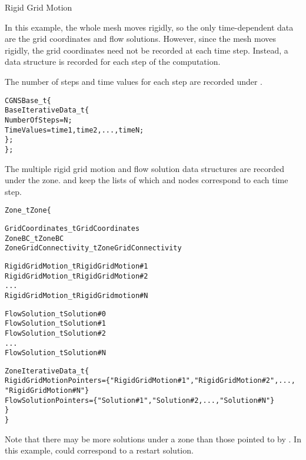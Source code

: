 \enlargethispage{\baselineskip}
\begin{example}{Rigid Grid Motion}
\label{ex:rigidmotion}

In this example, the whole mesh moves rigidly, so the only
time-dependent data are the grid coordinates and flow solutions.
However, since the mesh moves rigidly, the grid coordinates need not be
recorded at each time step.
Instead, a  data structure is recorded for
each step of the computation.

The number of steps and time values for each step are recorded under
.

\begin{alltt}
  CGNSBase\_t \{
    BaseIterativeData\_t \{
      NumberOfSteps = N ;
      TimeValues = time1, time2, ..., timeN ;
    \} ;
  \} ;
\end{alltt}

The multiple rigid grid motion and flow solution data structures are
recorded under the zone.
 and  keep the
lists of which  and  nodes
correspond to each time step.

\begin{alltt}
  Zone\_t Zone \{

    GridCoordinates\_t GridCoordinates
    ZoneBC\_t ZoneBC
    ZoneGridConnectivity\_t ZoneGridConnectivity

    RigidGridMotion\_t RigidGridMotion\#1
    RigidGridMotion\_t RigidGridMotion\#2
    ...
    RigidGridMotion\_t RigidGridmotion\#N

    FlowSolution\_t Solution\#0
    FlowSolution\_t Solution\#1
    FlowSolution\_t Solution\#2
    ...
    FlowSolution\_t Solution\#N

    ZoneIterativeData\_t \{
      RigidGridMotionPointers = \{"RigidGridMotion\#1", "RigidGridMotion\#2", ...,
         "RigidGridMotion\#N"\}
      FlowSolutionPointers = \{"Solution\#1", "Solution\#2, ..., "Solution\#N"\}
    \}
  \}
\end{alltt}

Note that there may be more solutions under a zone than those pointed to
by .
In this example,  could correspond to a restart solution.
\end{example}

